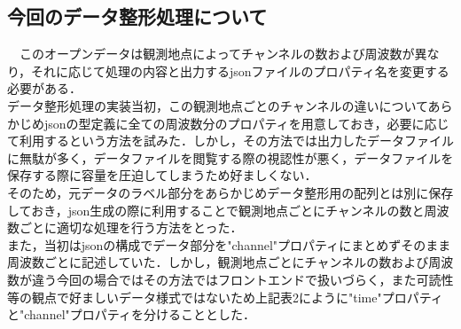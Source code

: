 
\subsection{今回のデータ整形処理について}
　このオープンデータは観測地点によってチャンネルの数および周波数が異なり，それに応じて処理の内容と出力するjsonファイルのプロパティ名を変更する必要がある．\\
 データ整形処理の実装当初，この観測地点ごとのチャンネルの違いについてあらかじめjsonの型定義に全ての周波数分のプロパティを用意しておき，必要に応じて利用するという方法を試みた．しかし，その方法では出力したデータファイルに無駄が多く，データファイルを閲覧する際の視認性が悪く，データファイルを保存する際に容量を圧迫してしまうため好ましくない．\\
 そのため，元データのラベル部分をあらかじめデータ整形用の配列とは別に保存しておき，json生成の際に利用することで観測地点ごとにチャンネルの数と周波数ごとに適切な処理を行う方法をとった．\\
 また，当初はjsonの構成でデータ部分を"channel"プロパティにまとめずそのまま周波数ごとに記述していた．しかし，観測地点ごとにチャンネルの数および周波数が違う今回の場合ではその方法ではフロントエンドで扱いづらく，また可読性等の観点で好ましいデータ様式ではないため上記表2にように"time"プロパティと"channel"プロパティを分けることとした．\\
 
